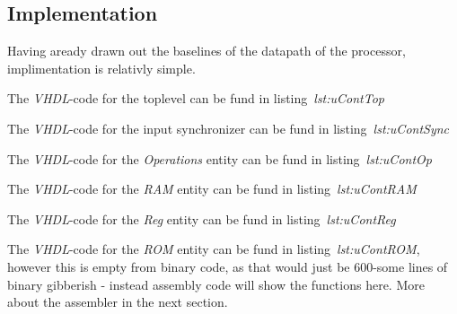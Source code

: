 \subsection{Implementation}
Having aready drawn out the baselines of the datapath of the processor,
implimentation is relativly simple.

The \emph{VHDL}-code for the toplevel can be fund in listing~\emph{lst:uContTop}

The \emph{VHDL}-code for the input synchronizer can be fund in
listing~\emph{lst:uContSync}

The \emph{VHDL}-code for the \emph{Operations} entity can be fund in
listing~\emph{lst:uContOp}

The \emph{VHDL}-code for the \emph{RAM} entity can be fund in
listing~\emph{lst:uContRAM}

The \emph{VHDL}-code for the \emph{Reg} entity can be fund in
listing~\emph{lst:uContReg}

The \emph{VHDL}-code for the \emph{ROM} entity can be fund in
listing~\emph{lst:uContROM}, however this is empty from binary code,
as that would just be 600-some lines of binary gibberish - instead assembly
code will show the functions here. More about the assembler in the next section.
